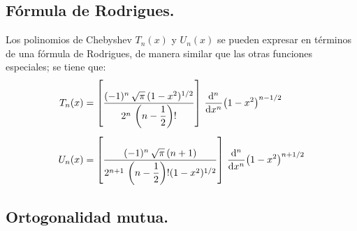 \documentclass[12pt]{article}
\numberwithin{equation}{section}
\begin{document}
\subsection{Fórmula de Rodrigues.}

Los polinomios de Chebyshev $T_{n}(x)$ y $U_{n}(x)$ se pueden expresar en términos de una fórmula de Rodrigues, de manera similar que las otras funciones especiales; se tiene que:
\begin{align*}
T_{n}(x) &= \left[ \dfrac{(-1)^{n} \, \sqrt{\pi} \, (1 - x^{2})^{1/2}}{2^{n} \, \left( n - \dfrac{1}{2} \right)!} \right] \, \dv[n]{x} (1 - x^{2})^{n-1/2} \\[0.5em]
U_{n}(x) &= \left[ \dfrac{(-1)^{n} \, \sqrt{\pi} \, (n+1)}{2^{n+1} \, \left( n - \dfrac{1}{2} \right)! (1 - x^{2})^{1/2}} \right] \, \dv[n]{x} (1 - x^{2})^{n+1/2}
\end{align*}

\subsection{Ortogonalidad mutua.}
\end{document}
